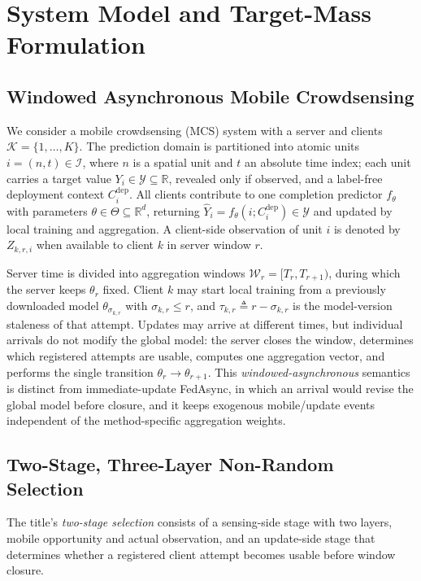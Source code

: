 \documentclass[letterpaper,journal]{IEEEtran}
\begin{document}
\section{System Model and Target-Mass Formulation}
\label{sec:system_model}

\subsection{Windowed Asynchronous Mobile Crowdsensing}
\label{subsec:windowed_mcs}

We consider a mobile crowdsensing (MCS) system with a server and clients
$\mathcal{K}=\{1,\ldots,K\}$.  The prediction domain is partitioned into atomic
units $i=(n,t)\in\mathcal{I}$, where $n$ is a spatial unit and $t$ an absolute
time index; each unit carries a target value
$Y_i\in\mathcal{Y}\subseteq\mathbb{R}$, revealed only if observed, and a
label-free deployment context $C_i^{\mathrm{dep}}$.  All clients contribute to
one completion predictor $f_{\theta}$ with parameters
$\theta\in\Theta\subseteq\mathbb{R}^{d}$, returning
$\widehat Y_i=f_{\theta}(i;C_i^{\mathrm{dep}})\in\mathcal{Y}$ and updated by
local training and aggregation.  A client-side observation of unit $i$ is
denoted by $Z_{k,r,i}$ when available to client $k$ in server window $r$.

Server time is divided into aggregation windows
$\mathcal{W}_r=[T_r,T_{r+1})$, during which the server keeps $\theta_r$ fixed.
Client $k$ may start local training from a previously downloaded model
$\theta_{\sigma_{k,r}}$ with $\sigma_{k,r}\le r$, and
$\tau_{k,r}\triangleq r-\sigma_{k,r}$ is the model-version staleness of that
attempt.  Updates may arrive at different times, but individual arrivals do not
modify the global model: the server closes the window, determines which
registered attempts are usable, computes one aggregation vector, and performs the
single transition $\theta_r\rightarrow\theta_{r+1}$.  This
\emph{windowed-asynchronous} semantics is distinct from immediate-update
FedAsync, in which an arrival would revise the global model before closure, and
it keeps exogenous mobile/update events independent of the method-specific
aggregation weights.

\subsection{Two-Stage, Three-Layer Non-Random Selection}
\label{subsec:selection_process}

The title's \emph{two-stage selection} consists of a sensing-side stage with two
layers, mobile opportunity and actual observation, and an update-side stage that
determines whether a registered client attempt becomes usable before window
closure.
\end{document}
